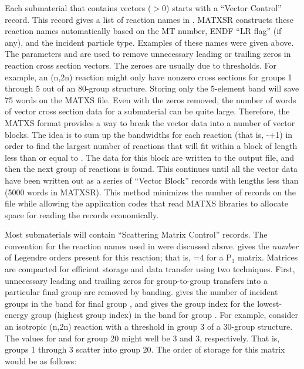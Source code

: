 Each submaterial that contains vectors ($>$0) starts with a
``Vector Control'' record.  This record gives a list of reaction names
in .  MATXSR constructs these
reaction names automatically
based on the MT number, ENDF ``LR flag'' (if any), and the incident
particle type.  Examples of these names were given above.  The
parameters  and  are used to remove unnecessary
leading or trailing zeros in reaction cross section vectors. The zeroes
are usually due to thresholds.  For example, an (n,2n) reaction might only
have nonzero cross sections for groups 1 through 5 out of an 80-group
structure.  Storing only the 5-element band will save 75 words on the
MATXS file.  Even with the zeros removed, the number of words of vector
cross section data for a submaterial can be quite large.  Therefore,
the MATXS format provides a way to break the vector data into a number
of vector blocks.  The idea is to sum up the bandwidths for each
reaction (that is, -+1) in order to find the
largest number of reactions that will fit within a block of length
less than or equal to .  The data for this block are
written to the output file, and then the next group of reactions is
found.  This continues until all the vector data have been written out
as a series of ``Vector Block'' records with lengths less than
 (5000 words in MATXSR).  This method minimizes
the number of records on the file while allowing the application codes
that read MATXS libraries to allocate space for reading the records
economically.

Most submaterials will contain  ``Scattering Matrix Control''
records.  The convention for the reaction names used in 
were discussed above.   gives the {\it number} of
Legendre orders present for this reaction; that is, =4
for a P$_3$ matrix.  Matrices are compacted for efficient storage
and data transfer using two techniques.  First, unnecessary leading
and trailing zeros for group-to-group transfers into a particular
final group are removed by banding.   gives the
number of incident groups in the band for final group ,
and  gives the group index for the lowest-energy group
(highest group index) in the band for group .  For example,
consider an isotropic (n,2n) reaction with a threshold in group 3 of a
30-group structure.  The values for  and 
for group 20 might well be 3 and 3, respectively.  That is, groups
1 through 3 scatter into group 20.  The order of storage for this
matrix would be as follows:

